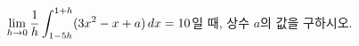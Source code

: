$\displaystyle\lim_{h\to 0}\dfrac{1}{h}\int_{1-5h}^{1+h} (3x^2-x+a)\mkern3mu dx=10$일 때, 상수 $a$의 값을 구하시오.
